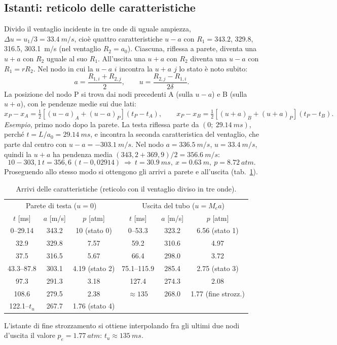\documentclass[11pt,a4paper]{article}
\newcommand{\uma}{u-a}
\newcommand{\upa}{u+a}
\begin{document}
\subsection*{Istanti: reticolo delle caratteristiche}
Divido il ventaglio incidente in tre onde di uguale ampiezza, $\Delta u=u_1/3=\SI{33.4}{m/s}$, cioè quattro
caratteristiche $\uma$ con $R_1=\num{343.2}$, \num{329.8}, \num{316.5}, \SI{303.1}{m/s} (nel ventaglio
$R_2=a_0$). Ciascuna, riflessa a parete, diventa una $\upa$ con $R_2$ uguale al suo $R_1$. All'uscita una
$\upa$ con $R_2$ diventa una $\uma$ con $R_1=r R_2$. Nel nodo in cui la $\uma$ $i$ incontra la $\upa$ $j$ lo
stato è noto subito:
\[
a=\frac{R_{1,i}+R_{2,j}}{2},\qquad u=\frac{R_{2,j}-R_{1,i}}{2\delta}.
\]
La posizione del nodo P si trova dai nodi precedenti A (sulla $\uma$) e B (sulla $\upa$), con le pendenze
medie sui due lati:
\[
x_P-x_A=\tfrac12\left[(u-a)_A+(u-a)_P\right](t_P-t_A),\qquad
x_P-x_B=\tfrac12\left[(u+a)_B+(u+a)_P\right](t_P-t_B).
\]
\emph{Esempio}, primo nodo dopo la parete. La testa riflessa parte da $(0;\ \SI{29.14}{ms})$, perché
$t=L/a_0=\SI{29.14}{ms}$, e incontra la seconda caratteristica del ventaglio, che parte dal centro con
$u-a=\SI{-303.1}{m/s}$. Nel nodo $a=\SI{336.5}{m/s}$, $u=\SI{33.4}{m/s}$, quindi la $\upa$ ha pendenza media
$(343{,}2+369{,}9)/2=\SI{356.6}{m/s}$:
\[
10-303{,}1\,t=356{,}6\,(t-0{,}02914)\ \Rightarrow\ t=\SI{30.9}{ms},\ x=\SI{0.63}{m},\ p=\SI{8.72}{atm}.
\]
Proseguendo allo stesso modo si ottengono gli arrivi a parete e all'uscita (tab.~\ref{tab:nodi}).

\begin{table}[H]
  \centering
  \small
  \begin{tabular}{ccc@{\qquad}ccc}
    \toprule
    \multicolumn{3}{c}{Parete di testa ($u=0$)} & \multicolumn{3}{c}{Uscita del tubo ($u=M_ea$)} \\
    $t$ [ms] & $a$ [m/s] & $p$ [atm] & $t$ [ms] & $a$ [m/s] & $p$ [atm] \\
    \midrule
    0--\num{29.14} & \num{343.2} & 10 (stato 0) & 0--\num{53.3} & \num{323.2} & \num{6.56} (stato 1) \\
    \num{32.9} & \num{329.8} & \num{7.57} & \num{59.2} & \num{310.6} & \num{4.97} \\
    \num{37.5} & \num{316.5} & \num{5.67} & \num{66.4} & \num{298.0} & \num{3.72} \\
    \num{43.3}--\num{87.8} & \num{303.1} & \num{4.19} (stato 2) & \num{75.1}--\num{115.9} & \num{285.4} & \num{2.75} (stato 3) \\
    \num{97.3} & \num{291.3} & \num{3.18} & \num{127.4} & \num{274.3} & \num{2.08} \\
    \num{108.6} & \num{279.5} & \num{2.38} & $\approx\num{135}$ & \num{268.0} & \num{1.77} (fine strozz.) \\
    \num{122.1}--$t_u$ & \num{267.7} & \num{1.76} (stato 4) & & & \\
    \bottomrule
  \end{tabular}
  \caption{Arrivi delle caratteristiche (reticolo con il ventaglio diviso in tre onde).}
  \label{tab:nodi}
\end{table}
L'istante di fine strozzamento si ottiene interpolando fra gli ultimi due nodi d'uscita il valore
$p_e=\SI{1.77}{atm}$: $t_u\approx\SI{135}{ms}$.
\end{document}
